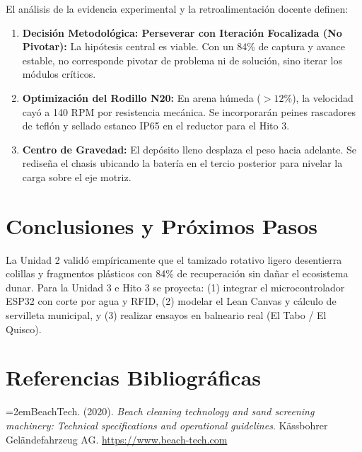 \documentclass[12pt,letterpaper]{article}
\newcommand{\hangapa}{\par\noindent\hangindent=2em\hangafter=1}
\begin{document}
El análisis de la evidencia experimental y la retroalimentación docente definen:
\begin{enumerate}[leftmargin=*, noitemsep]
    \item \textbf{Decisión Metodológica: Perseverar con Iteración Focalizada (No Pivotar):} La hipótesis central es viable. Con un 84\% de captura y avance estable, no corresponde pivotar de problema ni de solución, sino iterar los módulos críticos.
    \item \textbf{Optimización del Rodillo N20:} En arena húmeda ($>12\%$), la velocidad cayó a 140 RPM por resistencia mecánica. Se incorporarán peines rascadores de teflón y sellado estanco IP65 en el reductor para el Hito 3.
    \item \textbf{Centro de Gravedad:} El depósito lleno desplaza el peso hacia adelante. Se rediseña el chasis ubicando la batería en el tercio posterior para nivelar la carga sobre el eje motriz.
\end{enumerate}

\section{Conclusiones y Próximos Pasos}

La Unidad 2 validó empíricamente que el tamizado rotativo ligero desentierra colillas y fragmentos plásticos con 84\% de recuperación sin dañar el ecosistema dunar. Para la Unidad 3 e Hito 3 se proyecta: (1) integrar el microcontrolador ESP32 con corte por agua y RFID, (2) modelar el Lean Canvas y cálculo de servilleta municipal, y (3) realizar ensayos en balneario real (El Tabo / El Quisco).

\clearpage

\section{Referencias Bibliográficas}

\hangapa BeachTech. (2020). \textit{Beach cleaning technology and sand screening machinery: Technical specifications and operational guidelines}. Kässbohrer Geländefahrzeug AG. \url{https://www.beach-tech.com}
\end{document}
